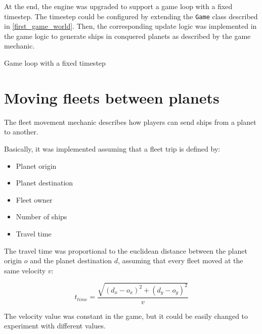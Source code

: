 \documentclass[a4paper,11pt,titlepage,abstract,numbers=noenddot,automark,mnsy,intlimits,rgb,dvipsnames]{report}
\begin{document}
At the end, the engine was upgraded to support a game loop with a fixed timestep. The timestep could be configured
by extending the \texttt{Game} class described in \autoref{first_game_world}. Then, the corresponding update logic was
implemented in the game logic to generate ships in conquered planets as described by the game mechanic.
\begin{algorithm}
\caption{Game loop with a fixed timestep}
\label{game_loop}
\begin{algorithmic}
\ENDWHILE
\ENDWHILE
\end{algorithmic}
\end{algorithm}
\section{Moving fleets between planets}
The fleet movement mechanic describes how players can send ships from a planet to another.

Basically, it was implemented assuming that a fleet trip is defined by:
\begin{itemize}
\item
Planet origin
\item
Planet destination
\item
Fleet owner
\item
Number of ships
\item
Travel time
\end{itemize}
The travel time was proportional to the euclidean distance between the planet origin $o$ and the planet destination $d$,
assuming that every fleet moved at the same velocity $v$:

$$t_{time} = \frac{\sqrt{(d_x - o_x)^2 + (d_y - o_y)^2}}{v}$$

The velocity value was constant in the game, but it could be easily changed to experiment with different values.
\end{document}
